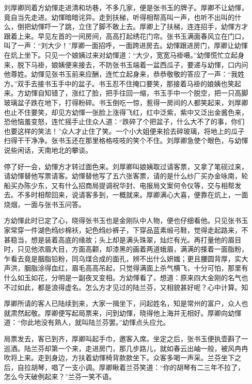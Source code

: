 \documentclass[12pt,UTF8]{ctexbook}
\begin{document}
{{{刘厚卿同着方幼惲走进清和坊巷，不多几家，便是张书玉的牌子。厚卿不让幼惲，竟自当先走进。幼惲暗暗诧异。走到扶梯，听得相帮高叫一声，也听不出叫的什么，倒把幼惲吓一了跳，立住了脚不敢上去。厚卿上了扶梯，连连招手，幼惲方才跟着上来。早见左首的一间房间，高高打起绣花门帘。张书玉满面春风立在门口，叫了一声：“刘大少！”厚卿一面招呼，一面跨进房去。幼惲跟进房门，厚卿让幼惲在炕上坐下。只见一个娘姨过来对幼惲道：“大少，宽宽马褂嗫。”幼惲慌忙立起身来，脱下马褂，娘姨便来接去，不防张书玉端着一盆西瓜子，要递与幼惲，口内问他尊姓。幼惲见张书玉前来应酬，连忙立起身来，恭恭敬敬的答应了一声：“我姓方。”双手去接书玉手中的盆子。书玉忍不住掩口要笑，那接着马褂的娘姨也笑起来。方幼惲自知错了，涨红了脸，把手往回一缩，书玉手中一个脱空，把一只高脚玻璃盆子跌在地下，打得粉碎。书玉倒吃一惊，惹得一房间的人都笑起来，刘厚卿也止不住要笑，却见方幼惲一张脸上涨得飞红，红中泛紫，紫中又泛出金酱色来，恐他恼羞变怒，连忙摇手止住众人道：“跌碎了个把盆子，什么大不了的事，你们也要这样的笑法！”众人才止住了笑。一个小大姐便来拾去碎玻璃，将地上的瓜子扫得干干净净。张书玉还在那里格格吱吱的笑个不住。刘厚卿急使个眼色，与幼惲说些闲话，天南地北的攀谈。

停了好一会，幼惲方才转过面色来。刘厚卿叫娘姨取过请客票，又拿了笔砚过来，请幼惲替他写票请客。幼惲替他写了五六张客票，请的是什么纱厂买办金咏南，轮船买办陈少东，又有什么招商局提调祝华封、电报局文案何令仪等，交与相帮发去。不多时相帮回来，说请客多到，一概就来。厚卿满心大喜，便靠在炕上，一面烧烟，一面与张书玉问答。

方幼惲此时已定了心，晓得张书玉也是金刚队中人物，便也仔细看他。只见张书玉家常穿一件湖色绉纱棉袄，妃色绉纱裤子，下穿品蓝素缎弓鞋，觉得走起路来，不甚稳当，想是装着高底的缘故；头上却是满头珠翠，灿烂有光。再打量他的眉目时，只见他浓眉大目，方面高颧，却漆黑的画着两道蛾眉，满满的搽着一面脂粉，乍看去竟是胭脂铅粉，同乌煤合成的面孔，辨不出什么妍媸；更且腰圆背厚，实大声洪，胭脂涂得血红，眉毛高高吊起，只觉得满面上杀气横飞，十分可怕，那里有什么如玉如花，分明是一副夜叉变相。方幼惲看了，想道：原来四大金刚的名气也不过如此，都是浪得虚名。怎么方才见过的陆兰芬，又相貌甚好呢？心中计算。知

厚卿所请的客人已陆续到来，大家一揖坐下，问起姓名，知是常州的富户，众人也就肃然起敬。厚卿便写起局票来，问到幼惲，晓得他上海并无相好。厚卿向幼惲道：“你此地没有熟人，就叫陆兰芬罢。”幼惲点头应允。

局票发去，客已到齐，厚卿叫起手巾，邀客入席。坐定之后，张书玉便执壶斟了一巡酒。陆兰芬却第一个来，走进房门，那几步路儿，就如春云出岫一般，被风冉冉吹将上来。走到身边，方扶着幼惲椅背款款坐下。众客多喝一声采。兰芬坐下之后，自拉胡琴，唱了一支小调。厚卿瞅着兰芬笑道：“你的胡琴有二三年不拉了，怎么今天破例起来？”兰芬一笑不语。

}}}
\end{document}
